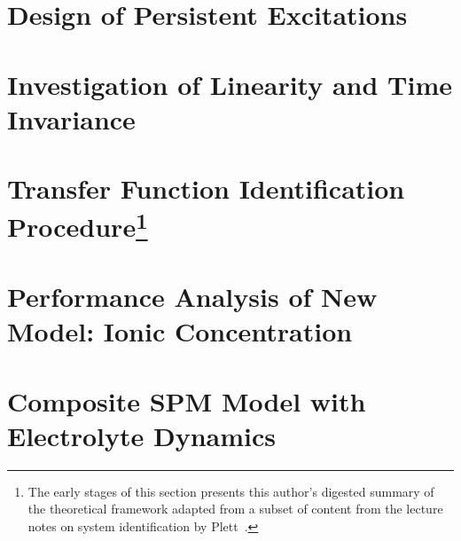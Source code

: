 \section{Design of Persistent Excitations}\label{sec:persistentexcitation}


\section{Investigation of Linearity and Time Invariance}\label{sec:lticheck}


\section[Transfer Function Identification Procedure]{Transfer Function Identification Procedure\footnote{The early stages of this section presents this author's digested summary of the theoretical framework adapted from a subset of content from the lecture notes on system identification by Plett~\cite{PlettECE5560_02,PlettECE5560_03,PlettECE5560_04}.}}\label{sec:actualsysid}


\section{Performance Analysis of New Model: Ionic Concentration}\label{sec:perfanalysisnewmodel}


\section{Composite SPM Model with Electrolyte Dynamics}


